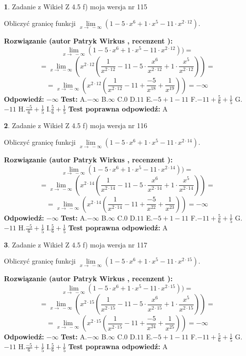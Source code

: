 \documentclass[12pt, a4paper]{article}
\theoremstyle{definition} %
\newtheorem{zad}{}
\newcommand{\zadStart}[1]{\begin{zad}#1\newline}
\newcommand{\zadStop}{\end{zad}}
\newcommand{\rozwStart}[2]{\noindent \textbf{Rozwiązanie (autor #1 , recenzent #2): }\newline}
\newcommand{\rozwStop}{\newline}
\newcommand{\odpStart}{\noindent \textbf{Odpowiedź:}\newline}
\newcommand{\odpStop}{\newline}
\newcommand{\testStart}{\noindent \textbf{Test:}\newline}
\newcommand{\testStop}{\newline}
\newcommand{\kluczStart}{\noindent \textbf{Test poprawna odpowiedź:}\newline}
\newcommand{\kluczStop}{\newline}
\begin{document}
\zadStart{Zadanie z Wikieł Z 4.5 f) moja wersja nr 115}



Obliczyć granicę funkcji  $\lim\limits_{x\to\ -\infty}(1 - 5 \cdot x^{6}+1 \cdot x^{5}- 11 \cdot x^{2\cdot12})$.
\zadStop
\rozwStart{Patryk Wirkus}{}
$$\lim\limits_{x\to\ -\infty}(1 - 5 \cdot x^{6}+1 \cdot x^{5}- 11 \cdot x^{2\cdot12}))=$$
$$=\lim\limits_{x\to\ -\infty}(x^{2\cdot12}(\frac{1}{x^{2\cdot12}}-11 -5 \cdot \frac{x^{6}}{x^{2\cdot12}}+1 \cdot \frac{x^{5}}{x^{2\cdot12}}))=$$
$$=\lim\limits_{x\to\ -\infty}(x^{2\cdot12}(\frac{1}{x^{2\cdot12}}-11 + \frac{-5}{x^{18}}+ \frac{1}{x^{19}}))=-\infty$$
\rozwStop
\odpStart
$-\infty$
\odpStop
\testStart
A.$-\infty$ B.$\infty$ C.$0$ D.$11$ E.$-5 + 1 - 11$
F.$-11+\frac{5}{6}+\frac{1}{5}$ G.$-11$
H.$\frac{-5}{6}+\frac{1}{5}$
I.$\frac{5}{6}+\frac{1}{5}$
\testStop
\kluczStart
A
\kluczStop



\zadStart{Zadanie z Wikieł Z 4.5 f) moja wersja nr 116}



Obliczyć granicę funkcji  $\lim\limits_{x\to\ -\infty}(1 - 5 \cdot x^{6}+1 \cdot x^{5}- 11 \cdot x^{2\cdot14})$.
\zadStop
\rozwStart{Patryk Wirkus}{}
$$\lim\limits_{x\to\ -\infty}(1 - 5 \cdot x^{6}+1 \cdot x^{5}- 11 \cdot x^{2\cdot14}))=$$
$$=\lim\limits_{x\to\ -\infty}(x^{2\cdot14}(\frac{1}{x^{2\cdot14}}-11 -5 \cdot \frac{x^{6}}{x^{2\cdot14}}+1 \cdot \frac{x^{5}}{x^{2\cdot14}}))=$$
$$=\lim\limits_{x\to\ -\infty}(x^{2\cdot14}(\frac{1}{x^{2\cdot14}}-11 + \frac{-5}{x^{22}}+ \frac{1}{x^{23}}))=-\infty$$
\rozwStop
\odpStart
$-\infty$
\odpStop
\testStart
A.$-\infty$ B.$\infty$ C.$0$ D.$11$ E.$-5 + 1 - 11$
F.$-11+\frac{5}{6}+\frac{1}{5}$ G.$-11$
H.$\frac{-5}{6}+\frac{1}{5}$
I.$\frac{5}{6}+\frac{1}{5}$
\testStop
\kluczStart
A
\kluczStop



\zadStart{Zadanie z Wikieł Z 4.5 f) moja wersja nr 117}



Obliczyć granicę funkcji  $\lim\limits_{x\to\ -\infty}(1 - 5 \cdot x^{6}+1 \cdot x^{5}- 11 \cdot x^{2\cdot15})$.
\zadStop
\rozwStart{Patryk Wirkus}{}
$$\lim\limits_{x\to\ -\infty}(1 - 5 \cdot x^{6}+1 \cdot x^{5}- 11 \cdot x^{2\cdot15}))=$$
$$=\lim\limits_{x\to\ -\infty}(x^{2\cdot15}(\frac{1}{x^{2\cdot15}}-11 -5 \cdot \frac{x^{6}}{x^{2\cdot15}}+1 \cdot \frac{x^{5}}{x^{2\cdot15}}))=$$
$$=\lim\limits_{x\to\ -\infty}(x^{2\cdot15}(\frac{1}{x^{2\cdot15}}-11 + \frac{-5}{x^{24}}+ \frac{1}{x^{25}}))=-\infty$$
\rozwStop
\odpStart
$-\infty$
\odpStop
\testStart
A.$-\infty$ B.$\infty$ C.$0$ D.$11$ E.$-5 + 1 - 11$
F.$-11+\frac{5}{6}+\frac{1}{5}$ G.$-11$
H.$\frac{-5}{6}+\frac{1}{5}$
I.$\frac{5}{6}+\frac{1}{5}$
\testStop
\kluczStart
A
\kluczStop
\end{document}
